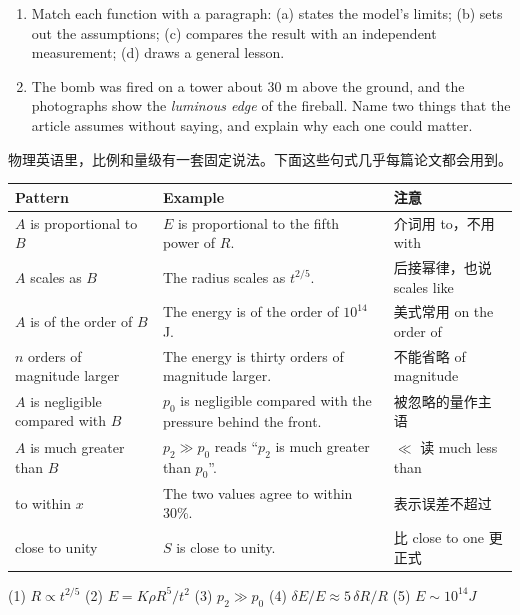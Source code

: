 \documentclass[11pt,a4paper]{article}
\begin{document}
\begin{enumerate}[label=\textbf{\arabic*.},resume]
  \item Match each function with a paragraph: (a) states the model's limits; (b) sets out the assumptions; (c) compares the result with an independent measurement; (d) draws a general lesson.
  \item The bomb was fired on a tower about 30 m above the ground, and the photographs show the \emph{luminous edge} of the fireball. Name two things that the article assumes without saying, and explain why each one could matter.
\end{enumerate}


物理英语里，比例和量级有一套固定说法。下面这些句式几乎每篇论文都会用到。

\vspace{-6pt}
\begin{center}
\small
\renewcommand{\arraystretch}{1.2}
\begin{tabular}{p{4.4cm}p{7.0cm}p{3.7cm}}
\toprule
\headrow Pattern & Example & 注意 \\
\midrule
$A$ is proportional to $B$ & $E$ is proportional to the fifth power of $R$. & 介词用 to，不用 with \\
$A$ scales as $B$ & The radius scales as $t^{2/5}$. & 后接幂律，也说 scales like \\
$A$ is of the order of $B$ & The energy is of the order of $10^{14}$ J. & 美式常用 on the order of \\
$n$ orders of magnitude larger & The energy is thirty orders of magnitude larger. & 不能省略 of magnitude \\
$A$ is negligible compared with $B$ & $p_0$ is negligible compared with the pressure behind the front. & 被忽略的量作主语 \\
$A$ is much greater than $B$ & $p_2\gg p_0$ reads ``$p_2$ is much greater than $p_0$''. & $\ll$ 读 much less than \\
to within $x$ & The two values agree to within 30\%. & 表示误差不超过 \\
close to unity & $S$ is close to unity. & 比 close to one 更正式 \\
\bottomrule
\end{tabular}
\end{center}
\vspace{-8pt}

(1) $R\propto t^{2/5}$ \qquad (2) $E=K\rho R^5/t^2$ \qquad (3) $p_2\gg p_0$ \qquad (4) $\delta E/E\approx5\,\delta R/R$ \qquad (5) $E\sim10^{14}\unit{J}$
\end{document}
